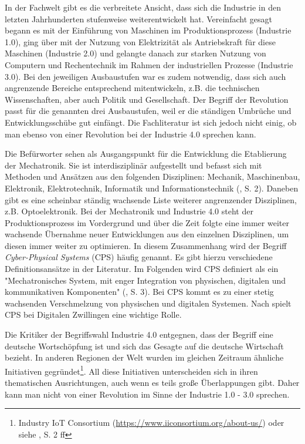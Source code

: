 \documentclass{article}
\begin{document}
In der Fachwelt gibt es die verbreitete Ansicht, dass sich die Industrie in den letzten Jahrhunderten stufenweise weiterentwickelt hat. Vereinfacht gesagt begann es mit der Einführung von Maschinen im Produktionsprozess (Industrie 1.0), ging über mit der Nutzung von Elektrizität als Antriebskraft für diese Maschinen (Industrie 2.0) und gelangte danach zur starken Nutzung von Computern und Rechentechnik im Rahmen der industriellen Prozesse (Industrie 3.0). Bei den jeweiligen Ausbaustufen war es zudem notwendig, dass sich auch angrenzende Bereiche entsprechend mitentwickeln, z.B. die technischen Wissenschaften, aber auch Politik und Gesellschaft. Der Begriff der Revolution passt für die genannten drei Ausbaustufen, weil er die ständigen Umbrüche und Entwicklungsschübe gut einfängt. Die Fachliteratur ist sich jedoch nicht einig, ob man ebenso von einer Revolution bei der Industrie 4.0 sprechen kann.

Die Befürworter sehen als Ausgangspunkt für die Entwicklung die Etablierung der Mechatronik. Sie ist interdisziplinär aufgestellt und befasst sich mit Methoden und Ansätzen aus den folgenden Disziplinen: Mechanik, Maschinenbau, Elektronik, Elektrotechnik, Informatik und Informationstechnik (\cite{ragavan2016engineering}, S. 2). Daneben gibt es eine scheinbar ständig wachsende Liste weiterer angrenzender Disziplinen, z.B. Optoelektronik. Bei der Mechatronik und Industrie 4.0 steht der Produktionsprozess im Vordergrund und über die Zeit folgte eine immer weiter wachsende Übernahme neuer Entwicklungen aus den einzelnen Disziplinen, um diesen immer weiter zu optimieren. In diesem Zusammenhang wird der Begriff \textit{Cyber-Physical Systems} (CPS) häufig genannt. Es gibt hierzu verschiedene Definitionsansätze in der Literatur. Im Folgenden wird CPS definiert als ein "Mechatronisches System, mit enger Integration von physischen, digitalen und kommunikativen Komponenten" (\cite{ragavan2016engineering}, S. 3). Bei CPS kommt es zu einer stetig wachsenden Verschmelzung von physischen und digitalen Systemen. Nach \cite{klein2019architektur} spielt CPS bei Digitalen Zwillingen eine wichtige Rolle.

Die Kritiker der Begriffswahl Industrie 4.0 entgegnen, dass der Begriff eine deutsche Wortschöpfung ist und sich das Gesagte auf die deutsche Wirtschaft bezieht. In anderen Regionen der Welt wurden im gleichen Zeitraum ähnliche Initiativen gegründet\footnote{Industry IoT Consortium (\url{https://www.iiconsortium.org/about-us/}) oder siehe \cite{trotta2018industry}, S. 2 ff}. All diese Initiativen unterscheiden sich in ihren thematischen Ausrichtungen, auch wenn es teils große Überlappungen gibt. Daher kann man nicht von einer Revolution im Sinne der Industrie 1.0 - 3.0 sprechen.
\end{document}

